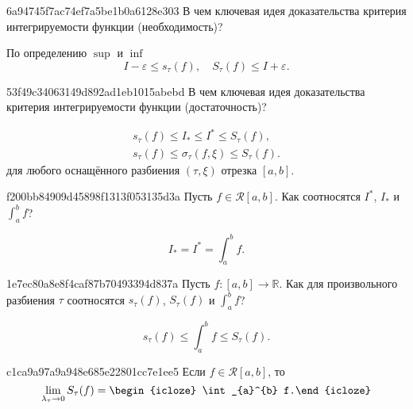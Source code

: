 \begin{note}{6a94745f7ac74ef7a5be1b0a6128e303}
    В чем ключевая идея доказательства критерия интегрируемости функции (необходимость)?

    \begin{cloze}{1}
        По определению \({ \sup }\) и \({ \inf }\)
        \[
            I - \varepsilon \leqslant s_\tau (f), \quad S_\tau (f) \leqslant I + \varepsilon.
        \]
    \end{cloze}
\end{note}

\begin{note}{53f49c34063149d892ad1eb1015abebd}
    В чем ключевая идея доказательства критерия интегрируемости функции (достаточность)?

    \begin{cloze}{1}
        \[
            \begin{gathered}
                s_\tau (f) \leqslant I_* \leqslant I^* \leqslant S_\tau (f), \\
                s_\tau (f) \leqslant \sigma_\tau (f, \xi) \leqslant S_\tau (f).
            \end{gathered}
        \]
        для любого оснащённого разбиения \({ (\tau, \xi) }\) отрезка \({ \left[ a, b \right] }\).
    \end{cloze}
\end{note}

\begin{note}{f200bb84909d45898f1313f053135d3a}
    Пусть \({ f \in \mathcal R[a, b] }\). Как соотносятся \({ I^* }\), \({ I_* }\) и \({ \int_{a}^{b} f }\)?

    \begin{cloze}{1}
        \[
            I_* = I^* = \int_{a}^{b} f.
        \]
    \end{cloze}
\end{note}

\begin{note}{1e7ec80a8e8f4caf87b70493394d837a}
    Пусть \({ f : [a, b] \to \mathbb R }\).
    Как для произвольного разбиения \({ \tau }\) соотносятся \({ s_\tau (f) }\), \({ S_\tau (f) }\) и \({ \int_{a}^{b} f }\)?

    \begin{cloze}{1}
        \[
            s_\tau (f) \leqslant \int_{a}^{b} f \leqslant S_\tau (f).
        \]
    \end{cloze}
\end{note}

\begin{note}{c1ca9a97a9a948e685e22801cc7e1ee5}
    Если \({ f \in \mathcal R\left[ a, b \right] }\), то
    \[
        \lim_{\lambda_\tau \to 0} S_\tau (f) = \begin{icloze}{1}\int_{a}^{b} f.\end{icloze}
    \]
\end{note}

